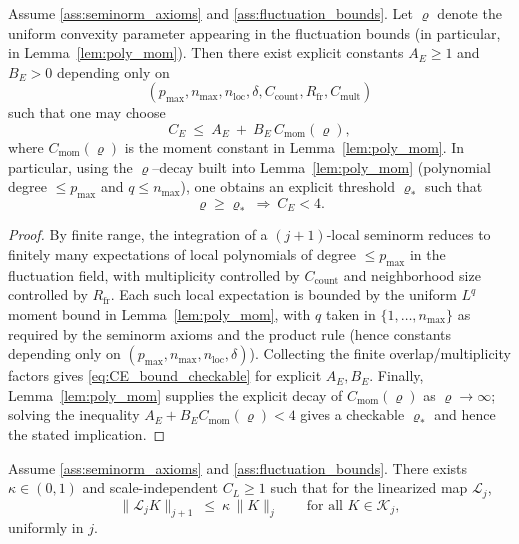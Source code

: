 \begin{lemma}\label{lem:CE_checkable}
Assume \ref{ass:seminorm_axioms} and \ref{ass:fluctuation_bounds}. Let $\varrho$ denote the uniform convexity parameter appearing in the fluctuation bounds (in particular, in Lemma~\ref{lem:poly_mom}).
Then there exist explicit constants $A_E\ge 1$ and $B_E>0$ depending only on
\[
(p_{\max},n_{\max},n_{\mathrm{loc}},\delta, C_{\mathrm{count}},R_{\mathrm{fr}},C_{\mathrm{mult}})
\]
such that one may choose
\begin{equation}\label{eq:CE_bound_checkable}
C_E\ \le\ A_E\ +\ B_E\,C_{\mathrm{mom}}(\varrho),
\end{equation}
where $C_{\mathrm{mom}}(\varrho)$ is the moment constant in Lemma~\ref{lem:poly_mom}.
In particular, using the $\varrho$--decay built into Lemma~\ref{lem:poly_mom} (polynomial degree $\le p_{\max}$ and $q\le n_{\max}$), one obtains an explicit threshold $\varrho_\ast$ such that
\[
\varrho\ge \varrho_\ast\ \Longrightarrow\ C_E<4.
\]
\end{lemma}

\begin{proof}
By finite range, the integration of a $(j+1)$-local seminorm reduces to finitely many expectations of local polynomials of degree $\le p_{\max}$ in the fluctuation field, with multiplicity controlled by $C_{\mathrm{count}}$ and neighborhood size controlled by $R_{\mathrm{fr}}$.
Each such local expectation is bounded by the uniform $L^q$ moment bound in Lemma~\ref{lem:poly_mom}, with $q$ taken in $\{1,\dots,n_{\max}\}$ as required by the seminorm axioms and the product rule (hence constants depending only on $(p_{\max},n_{\max},n_{\mathrm{loc}},\delta)$).
Collecting the finite overlap/multiplicity factors gives \eqref{eq:CE_bound_checkable} for explicit $A_E,B_E$.
Finally, Lemma~\ref{lem:poly_mom} supplies the explicit decay of $C_{\mathrm{mom}}(\varrho)$ as $\varrho\to\infty$; solving the inequality $A_E+B_E C_{\mathrm{mom}}(\varrho)<4$ gives a checkable $\varrho_\ast$ and hence the stated implication.
\end{proof}

\begin{lemma}\label{lem:L_contraction}
Assume \ref{ass:seminorm_axioms} and \ref{ass:fluctuation_bounds}.
There exists $\kappa\in(0,1)$ and scale-independent $C_L\ge 1$ such that for the linearized map $\mathcal L_j$,
\[
\|\mathcal L_j K\|_{j+1}\ \le\ \kappa\,\|K\|_j
\qquad\text{for all }K\in\mathscr K_j,
\]
uniformly in $j$.
\end{lemma}

